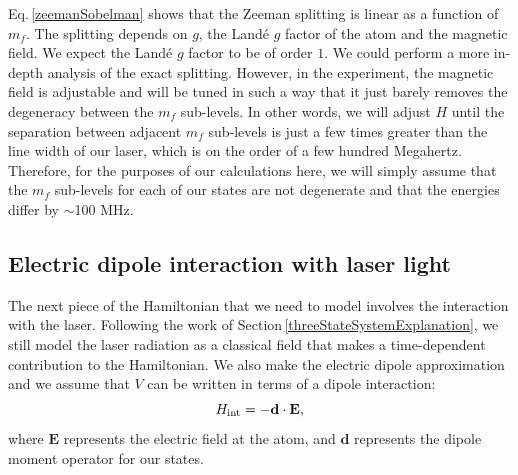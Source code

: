 Eq.\,\ref{zeemanSobelman} shows that the Zeeman splitting is linear as a function of $m_f$. The splitting depends on $g$, the Land\'e $g$ factor of the atom and the magnetic field. We expect the Land\'e $g$ factor to be of order $1$. We could perform a more in-depth analysis of the exact splitting. However, in the experiment, the magnetic field is adjustable and will be tuned in such a way that it just barely removes the degeneracy between the $m_f$ sub-levels. In other words, we will adjust $H$ until the separation between adjacent $m_f$ sub-levels is just a few times greater than the line width of our laser, which is on the order of a few hundred Megahertz. Therefore, for the purposes of our calculations here, we will simply assume that the $m_f$ sub-levels for each of our states are not degenerate and that the energies differ by $\sim$100 MHz.

\subsection{Electric dipole interaction with laser light}
\label{ElectricDipoleInteraction}
The next piece of the Hamiltonian that we need to model involves the interaction with the laser. Following the work of Section\,\ref{threeStateSystemExplanation}, we still model the laser radiation as a classical field that makes a time-dependent contribution to the Hamiltonian. We also make the electric dipole approximation and we assume that $V$ can be written in terms of a dipole interaction:  \cite{demilleBudkerKimball,cuaMITnotes,gustavsonThesis,Young1997363}
\begin{equation}
H_{\textnormal{int}}=-\mathbf{d}\cdot\mathbf{E},
\end{equation}
where $\mathbf{E}$ represents the electric field at the atom, %
and $\mathbf{d}$ represents the dipole moment operator for our states. 


